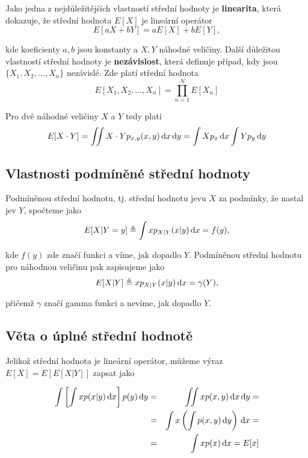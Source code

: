 	Jako jedna z nejdůležitějších vlastností střední hodnoty je \textbf{linearita}, která dokazuje, že střední hodnota $E[X]$ je lineární operátor
	\[ E[aX+bY] = aE[X] + bE[Y], \]
	
	kde koeficienty $a,b$ jsou konstanty a $X,Y$ náhodné veličiny. Další důležitou vlastností střední hodnoty je \textbf{nezávislost}, která definuje případ, kdy jsou $\{X_1,X_2,\ldots, X_n\}$ nezávislé. Zde platí střední hodnota
	\[ E[X_1,X_2,\ldots,X_n]=\prod_{n=1}^N E[X_n] \]
	
	Pro dvě náhodné veličiny $X$ a $Y$ tedy platí
	\[ E[X\cdot Y] = \iint X\cdot Y p_{x,y}(x,y)\,\mathrm{d} x\,\mathrm{d} y = \int Xp_x\,\mathrm{d} x\int Y p_y\,\mathrm{d} y \]
	
	\subsection{Vlastnosti podmíněné střední hodnoty}
	Podmíněnou střední hodnotu, tj. střední hodnotu jevu $X$ za podmínky, že nastal jev $Y$, spočteme jako
	\[ E[X|Y=y]\triangleq \int x p_{X|Y}(x|y)\,\mathrm{d} x = f(y), \]
	
	kde $f(y)$ zde značí funkci a víme, jak dopadlo $Y$. Podmíněnou střední hodnotu pro náhodnou veličinu pak zapisujeme jako
	\[ E[X|Y]\triangleq x p_{X|Y}(x|y)\,\mathrm{d} x = \gamma(Y), \]
	
	přičemž $\gamma$ značí gamma funkci a nevíme, jak dopadlo $Y$.
	
	\subsection{Věta o úplné střední hodnotě}
	Jelikož střední hodnota je lineární operátor, můžeme výraz $E[X]=E[E[X|Y]]$ zapsat jako
	
	\begin{eqnarray*}
	\int\left[\int xp(x|y)\,\mathrm{d} x\right]p(y)\,\mathrm{d} y & = & \iint xp(x,y)\,\mathrm{d} x\,\mathrm{d} y = \\
	& = & \int x\left(\int p(x,y)\,\mathrm{d} y\right)\,\mathrm{d} x =\\
	& = & \int x p(x)\,\mathrm{d} x = E[x]
	\end{eqnarray*}
	
